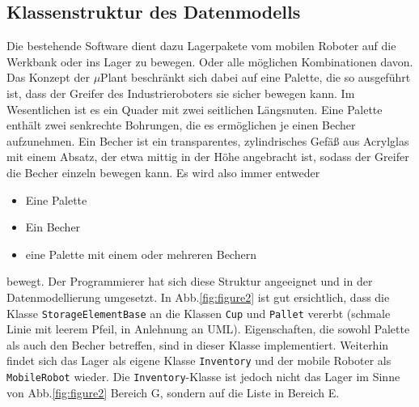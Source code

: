     \subsection{Klassenstruktur des Datenmodells}\label{Datenmodell}

    Die bestehende Software dient dazu Lagerpakete vom mobilen Roboter auf die Werkbank oder ins Lager zu bewegen.
    Oder alle möglichen Kombinationen davon.
    Das Konzept der $\mu$Plant beschränkt sich dabei auf eine Palette, die so ausgeführt ist, dass der Greifer des
    Industrieroboters sie sicher bewegen kann.
    Im Wesentlichen ist es ein Quader mit zwei seitlichen Längsnuten.
    Eine Palette enthält zwei senkrechte Bohrungen, die es ermöglichen je einen Becher aufzunehmen.
    Ein Becher ist ein transparentes, zylindrisches Gefäß aus Acrylglas mit einem Absatz, der etwa mittig in der
    Höhe angebracht ist, sodass der Greifer die Becher einzeln bewegen kann.
    Es wird also immer entweder
    \begin{itemize}
        \item Eine Palette
        \item Ein Becher
        \item eine Palette mit einem oder mehreren Bechern
    \end{itemize}
    bewegt.
    Der Programmierer hat sich diese Struktur angeeignet und in der Datenmodellierung umgesetzt.
    In Abb.\ref{fig:figure2} ist gut ersichtlich, dass die Klasse \verb|StorageElementBase| an die Klassen \verb|Cup| und \verb|Pallet|
    vererbt (schmale Linie mit leerem Pfeil, in Anlehnung an UML). Eigenschaften, die sowohl Palette als auch den
    Becher betreffen, sind in dieser Klasse implementiert.
    Weiterhin findet sich das Lager als eigene Klasse \verb|Inventory| und der mobile Roboter als \verb|MobileRobot| wieder.
    Die \verb|Inventory|-Klasse ist jedoch nicht das Lager im Sinne von Abb.\ref{fig:figure2} Bereich \glqq G\grqq, sondern auf die Liste in
    Bereich \glqq E\grqq.
    \\
